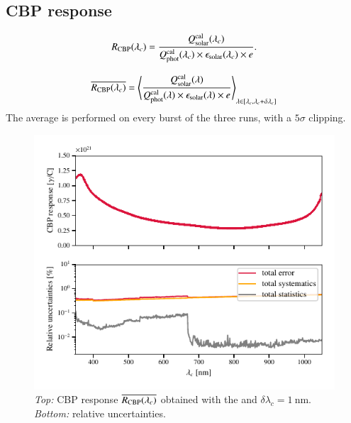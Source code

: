 \subsection{CBP response}


\begin{equation}
    R_{\mathrm{CBP}}(\lambda_c) = \frac{Q_{\mathrm{solar}}^{\rm cal}(\lambda_c)}{Q_{\mathrm{phot}}^{\rm cal}(\lambda_c) \times \epsilon_{\mathrm{solar}}(\lambda_c) \times e}.
    \label{eq:rcbp2}
\end{equation} 

\begin{equation}
    \overline{R_{\mathrm{CBP}}(\lambda_c)} = \left\langle\frac{Q_{\mathrm{solar}}^{\rm cal}(\lambda)}{Q_{\mathrm{phot}}^{\rm cal}(\lambda) \times \epsilon_{\mathrm{solar}}(\lambda) \times e}\right\rangle_{\lambda\in [\lambda_c,\lambda_c+\delta \lambda_c]}
    \label{eq:rcbp3}
\end{equation} 
The average is performed on every burst of the three runs, with a $5\sigma$ clipping.


\begin{figure}[h]
    \centering
    \includegraphics[width=\columnwidth]{fig/cbp_response.pdf}
    \caption{\textit{Top:} CBP response $\overline{R_{\mathrm{CBP}}(\lambda_c)}$ obtained with the \bpinhole and $\delta \lambda_c = \SI{1}{\nm}$. \textit{Bottom:} relative uncertainties.}
    \label{fig:cbp_response}
\end{figure}